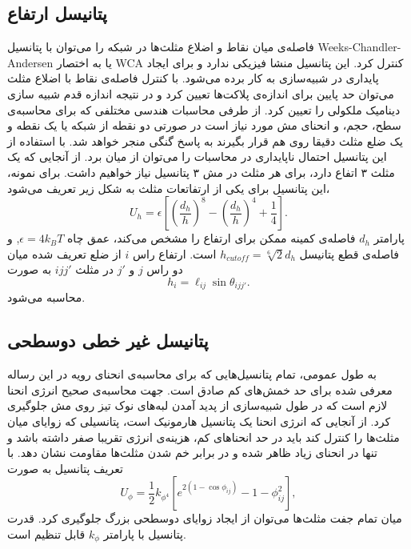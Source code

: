 \subsection{
پتانیسل ارتفاع
}

فاصله‌ی میان نقاط و اضلاع مثلث‌ها در شبکه را می‌توان با پتانسیل 
Weeks-Chandler-Andersen
یا به اختصار
WCA
کنترل کرد. این پتانسیل منشا فیزیکی ندارد و برای ایجاد پایداری در شبیه‌سازی به کار برده می‌شود. با کنترل فاصله‌ی نقاط با اضلاع مثلث‌ می‌توان حد پایین برای اندازه‌ی پلاکت‌ها تعیین کرد و در نتیجه اندازه قدم شبیه‌ سازی دینامیک ملکولی را تعیین کرد. از طرفی محاسبات هندسی مختلفی که برای محاسبه‌ی سطح، حجم، و انحنای مش مورد نیاز است در صورتی دو نقطه از شبکه یا یک نقطه و یک ضلع مثلث دقیقا روی هم قرار بگیرند به پاسخ گنگی منجر خواهد شد. با استفاده از این پتانسیل احتمال ناپایداری در محاسبات را می‌توان از میان برد. از آنجایی که یک مثلث ۳ اتفاع دارد، برای هر مثلث در مش ۳ پتانسیل نیاز خواهیم داشت. برای نمونه، این پتانسیل برای یکی از ارتفاتعات مثلث به شکل زیر تعریف می‌شود،
\begin{equation}
U_{h}=\epsilon\left[\left(\frac{d_h}{h}\right)^8-\left(\frac{d_h}{h}\right)^4+\frac{1}{4}\right].
\label{eq:wcah}
\end{equation} 
پارامتر
$d_h$
فاصله‌ی کمینه ممکن برای ارتفاع را مشخص می‌کند،  عمق چاه
$\epsilon=4k_BT$,
 و فاصله‌ی قطع
پتانیسل 
$h_{cutoff}=\sqrt[6]{2}d_h$
است. ارتفاع راس
$i$
از ضلع تعریف شده میان دو راس
$j$
و
$j'$
در مثلث
$ijj'$
به صورت 
\begin{equation}
h_i=\ell_{ij}\sin\theta_{ijj'}.
\end{equation} 
محاسبه می‌شود.

\subsection{
پتانیسل غیر خطی دوسطحی
}
به طول عمومی، تمام پتانسیل‌هایی که برای محاسبه‌ی انحنای رویه در این رساله معرفی شده برای حد خمش‌های کم صادق است. جهت محاسبه‌ی صحیح انرژی انحنا لازم است که در طول شبیه‌سازی از پدید آمدن لبه‌های نوک تیز روی مش جلوگیری کرد. از آنجایی که انرژی انحنا یک پتانسیل هارمونیک است، پتانسیلی که زوایای میان مثلث‌ها را کنترل کند باید در حد انحناهای کم، هزینه‌ی انرژی تقریبا صفر داشته باشد و تنها در  انحنای زیاد ظاهر شده و در برابر خم شدن مثلث‌ها مقاومت نشان دهد. با تعریف پتانسیل به صورت
\begin{equation}
U_{\phi}=\frac{1}{2}k_{\phi^4}\left[e^{2(1-\cos\phi_{ij})}-1-\phi_{ij}^2 \right],
\label{eq:theta4}
\end{equation}
میان تمام جفت مثلث‌ها می‌توان از ایجاد زوایای دوسطحی بزرگ جلوگیری کرد. قدرت پتانسیل با پارامتر 
$k_{\phi}$
قابل تنظیم است.










